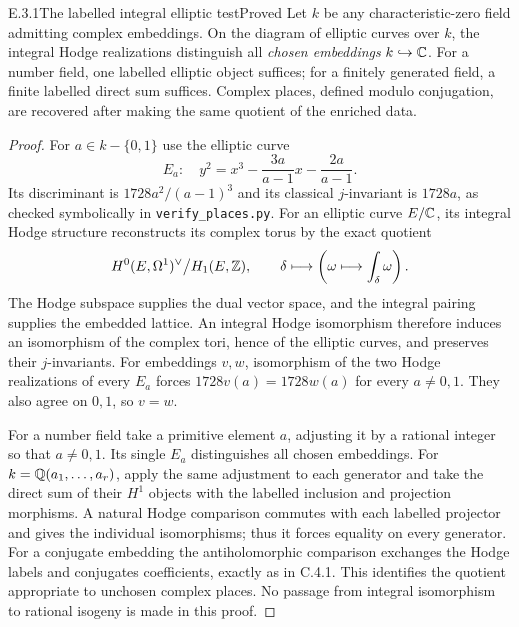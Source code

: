 \begin{result}{E.3.1}{The labelled integral elliptic test}{Proved}
Let $k$ be any characteristic-zero field admitting complex embeddings. On the diagram of elliptic curves over $k$, the integral Hodge realizations distinguish all \emph{chosen embeddings} $k\hookrightarrow\mathbb C$. For a number field, one labelled elliptic object suffices; for a finitely generated field, a finite labelled direct sum suffices. Complex places, defined modulo conjugation, are recovered after making the same quotient of the enriched data.
\end{result}
\begin{proof}
For $a\in k-\{0,1\}$ use the elliptic curve
\[
 E_a:\quad y^2=x^3-\frac{3a}{a-1}x-\frac{2a}{a-1}.
\]
Its discriminant is $1728a^2/(a-1)^3$ and its classical $j$-invariant is $1728a$, as checked symbolically in \texttt{verify\_places.py}. For an elliptic curve $E/\mathbb C$, its integral Hodge structure reconstructs its complex torus by the exact quotient
\[
 H^0(E,\Omega^1)^\vee\big/H_1(E,\mathbb Z),
 \qquad
 \delta\longmapsto\left(\omega\longmapsto\int_\delta\omega\right).
\]
The Hodge subspace supplies the dual vector space, and the integral pairing supplies the embedded lattice. An integral Hodge isomorphism therefore induces an isomorphism of the complex tori, hence of the elliptic curves, and preserves their $j$-invariants. For embeddings $v,w$, isomorphism of the two Hodge realizations of every $E_a$ forces $1728v(a)=1728w(a)$ for every $a\ne0,1$. They also agree on $0,1$, so $v=w$.

For a number field take a primitive element $a$, adjusting it by a rational integer so that $a\ne0,1$. Its single $E_a$ distinguishes all chosen embeddings. For $k=\mathbb Q(a_1,\ldots,a_r)$, apply the same adjustment to each generator and take the direct sum of their $H^1$ objects with the labelled inclusion and projection morphisms. A natural Hodge comparison commutes with each labelled projector and gives the individual isomorphisms; thus it forces equality on every generator. For a conjugate embedding the antiholomorphic comparison exchanges the Hodge labels and conjugates coefficients, exactly as in C.4.1. This identifies the quotient appropriate to unchosen complex places. No passage from integral isomorphism to rational isogeny is made in this proof.
\end{proof}

